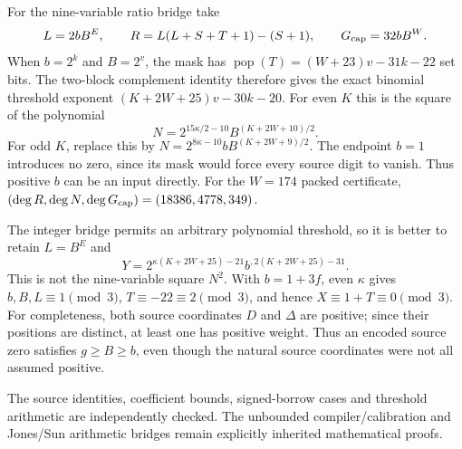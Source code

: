 For the nine-variable ratio bridge take
\[
 L=2bB^E,\qquad R=L(L+S+T+1)-(S+1),\qquad G_{\rm cap}=32bB^W.
\]
When $b=2^k$ and $B=2^v$, the mask has
$\operatorname{pop}(T)=(W+23)v-31k-22$ set bits.
The two-block complement identity therefore gives the exact binomial
threshold exponent $(K+2W+25)v-30k-20$.
For even $K$ this is the square of the polynomial
\[
 N=2^{15\kappa/2-10}B^{(K+2W+10)/2}.
\]
For odd $K$, replace this by
$N=2^{8\kappa-10}bB^{(K+2W+9)/2}$.
The endpoint $b=1$ introduces no zero, since its mask would force every
source digit to vanish. Thus positive $b$ can be an input directly.
For the $W=174$ packed certificate,
$(\deg R,\deg N,\deg G_{\rm cap})=(18386,4778,349)$.

The integer bridge permits an arbitrary polynomial threshold, so it is
better to retain $L=B^E$ and
\[
 Y=2^{\kappa(K+2W+25)-21}b^{,2(K+2W+25)-31}.
\]
This is not the nine-variable square $N^2$.
With $b=1+3f$, even $\kappa$ gives $b,B,L\equiv1\pmod3$,
$T\equiv-22\equiv2\pmod3$, and hence $X\equiv1+T\equiv0\pmod3$.
For completeness, both source coordinates $D$ and $\Delta$ are positive;
since their positions are distinct, at least one has positive weight.
Thus an encoded source zero satisfies $g\ge B\ge b$, even though the
natural source coordinates were not all assumed positive.

The source identities, coefficient bounds, signed-borrow cases and threshold
arithmetic are independently checked. The unbounded compiler/calibration and
Jones/Sun arithmetic bridges remain explicitly inherited mathematical proofs.
